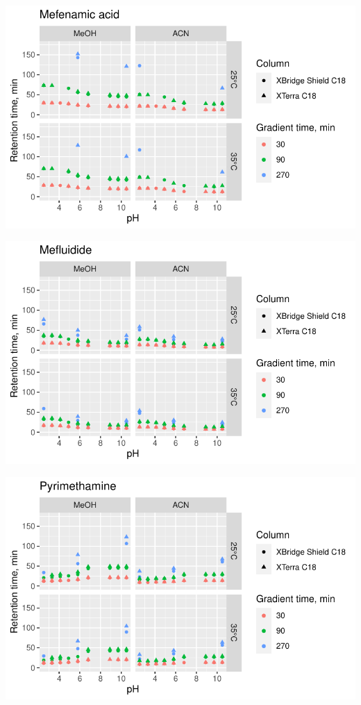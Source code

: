\documentclass[
  letterpaper,
  DIV=11,
  numbers=noendperiod]{scrreprt}
\begin{document}
\includegraphics{index_files/figure-pdf/unnamed-chunk-4-147.pdf}

\includegraphics{index_files/figure-pdf/unnamed-chunk-4-148.pdf}

\includegraphics{index_files/figure-pdf/unnamed-chunk-4-149.pdf}
\end{document}
